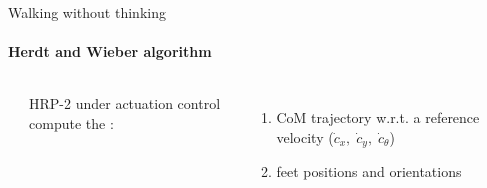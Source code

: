 
\begin{frame}[t]{Walking without thinking}
\framesubtitle{Herdt and Wieber algorithm}

\begin{columns}[T]

\vspace*{2.0cm}
\begin{minipage}[t]{0.5\textwidth}
  \begin{center}
    \scalebox{0.7}{} \\
  \end{center}
\end{minipage}

\vspace*{1.5cm}
\begin{minipage}[t]{\textwidth}
  HRP-2 under actuation control compute the : 
  \begin{enumerate}
    \item {\color{black!20!red} CoM trajectory} w.r.t. a reference velocity
      ($\dot{c}_x,\;\dot{c}_y,\;\dot{c}_{\theta} $)
    \item {\color{black!20!red} feet positions and orientations} \footnotemark
  \end{enumerate}
\end{minipage}

\end{columns}
\end{frame}


